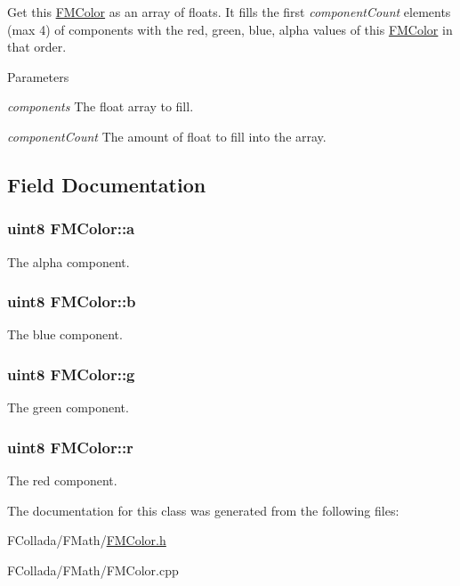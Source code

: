 \label{classFMColor_a89dcfa30dd18ff55c4aa79504fcabf24}
Get this \hyperlink{classFMColor}{FMColor} as an array of {\ttfamily floats}. It fills the first {\itshape componentCount\/} elements (max 4) of {\ttfamily components} with the red, green, blue, alpha values of this \hyperlink{classFMColor}{FMColor} in that order. 
\begin{DoxyParams}{Parameters}
\item[{\em components}]The {\ttfamily float} array to fill. \item[{\em componentCount}]The amount of {\ttfamily float} to fill into the array. \end{DoxyParams}


\subsection{Field Documentation}
\hypertarget{classFMColor_a42355f56b082b874c5580a9b4625be7c}{
\subsubsection[{a}]{\setlength{\rightskip}{0pt plus 5cm}uint8 {\bf FMColor::a}}}
\label{classFMColor_a42355f56b082b874c5580a9b4625be7c}
The alpha component. \hypertarget{classFMColor_aba4a975fc1d71d6f0065cf67f90d3c45}{
\subsubsection[{b}]{\setlength{\rightskip}{0pt plus 5cm}uint8 {\bf FMColor::b}}}
\label{classFMColor_aba4a975fc1d71d6f0065cf67f90d3c45}
The blue component. \hypertarget{classFMColor_a0868b26c7d46f6fd5fb753e63010c377}{
\subsubsection[{g}]{\setlength{\rightskip}{0pt plus 5cm}uint8 {\bf FMColor::g}}}
\label{classFMColor_a0868b26c7d46f6fd5fb753e63010c377}
The green component. \hypertarget{classFMColor_a36789d346608eb0c778d58204ea1f406}{
\subsubsection[{r}]{\setlength{\rightskip}{0pt plus 5cm}uint8 {\bf FMColor::r}}}
\label{classFMColor_a36789d346608eb0c778d58204ea1f406}
The red component. 

The documentation for this class was generated from the following files:\begin{DoxyCompactItemize}
\item 
FCollada/FMath/\hyperlink{FMColor_8h}{FMColor.h}\item 
FCollada/FMath/FMColor.cpp\end{DoxyCompactItemize}
